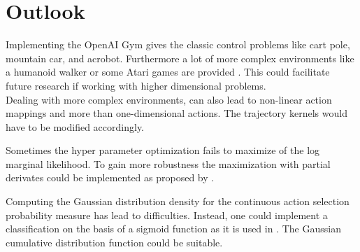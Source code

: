 \chapter{Outlook}
\label{chap:7}


Implementing the OpenAI Gym gives the classic control problems like cart pole, mountain car, and acrobot. Furthermore a lot of more complex environments like a humanoid walker or some Atari games are provided \cite{DBLP:journals/corr/BrockmanCPSSTZ16}. This could facilitate future research if working with higher dimensional problems.\\
Dealing with more complex environments, can also lead to non-linear action mappings and more than one-dimensional actions. The trajectory kernels would have to be modified accordingly.

Sometimes the hyper parameter optimization fails to maximize of the log marginal likelihood. To gain more robustness the maximization with partial derivates could be implemented as proposed by \cite{rasmussen2006gaussian, lizotte2008practical}.

Computing the Gaussian distribution density for the continuous action selection probability measure has lead to difficulties. Instead, one could implement a classification on the basis of a sigmoid function as it is used in \cite{rasmussen2006gaussian}. The Gaussian cumulative distribution function could be suitable.
